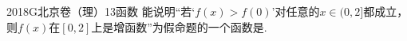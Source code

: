 
\begin{problem}{2018}{G}{北京卷（理）}{13}{函数}
能说明“若‘$f(x)>f(0)$’对任意的$x\in(0,2]$都成立，则$f(x)$在$[0,2]$上是增函数”为假命题的一个函数是\underline{\hspace{4em}}.
\end{problem}

\begin{answer}

\end{answer}

\begin{solutions}

\end{solutions}